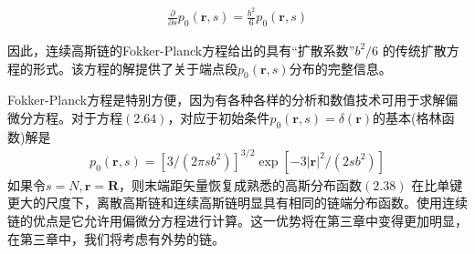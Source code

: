 \begin{gather}
\frac{\partial}{\partial s}p_0(\mathbf{r},s)=\frac{b^2}{6}p_0(\mathbf{r},s)
\end{gather}

因此，连续高斯链的Fokker-Planck方程给出的具有“扩散系数”$b^2/6$
的传统扩散方程的形式。该方程的解提供了关于端点段$p_0(\mathbf{r},s)$分布的完整信息。

Fokker-Planck方程是特别方便，因为有各种各样的分析和数值技术可用于求解偏微分方程。对于方程$(2.64)$，对应于初始条件$p_0(\mathbf{r},s)=\delta(\mathbf{r})$的基本(格林函数)解是
\begin{gather}
p_0(\mathbf{r},s)=\left[ 3/(2 \pi sb^2) \right]^{3/2}\exp \left[ -3\left| \mathbf{r} \right|^2/(2sb^2) \right]
\end{gather}
如果令$s=N,\mathbf{r}=\mathbf{R}$，则末端距矢量恢复成熟悉的高斯分布函数$(2.38)$
在比单键更大的尺度下，离散高斯链和连续高斯链明显具有相同的链端分布函数。使用连续链的优点是它允许用偏微分方程进行计算。这一优势将在第三章中变得更加明显，在第三章中，我们将考虑有外势的链。
